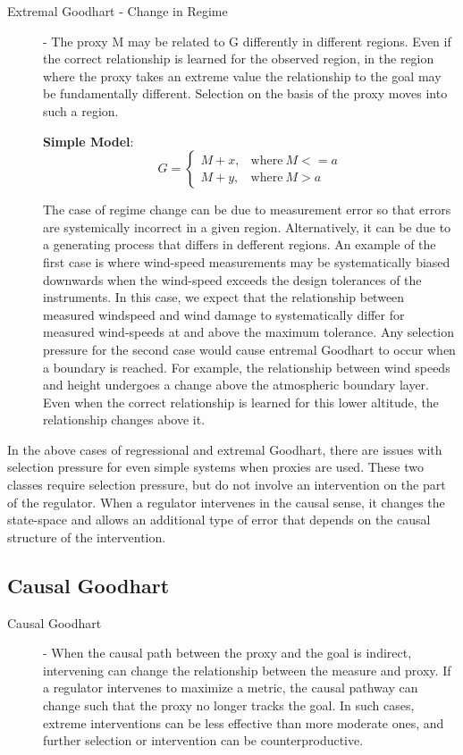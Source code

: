 \documentclass[10pt]{article}
\begin{document}
\begin{description}
\item[Extremal Goodhart - Change in Regime] - The proxy M may be related to G differently in different regions. Even if the correct relationship is learned for the observed region, in the region where the proxy takes an extreme value the relationship to the goal may be fundamentally different. Selection on the basis of the proxy moves into such a region.

\textbf{Simple Model}:  \begin{equation}
    G =
    \begin{cases}
      M + x, & \text{where}\ M <= a \\
      M + y, & \text{where}\ M > a 
    \end{cases}
  \end{equation}

The case of regime change can be due to measurement error so that errors are systemically incorrect in a given region. Alternatively, it can be due to a generating process that differs in defferent regions. An example of the first case is where wind-speed measurements may be systematically biased downwards when the wind-speed exceeds the design tolerances of the instruments. In this case, we expect that the relationship between measured windspeed and wind damage to systematically differ for measured wind-speeds at and above the maximum tolerance. Any selection pressure for the second case would cause entremal Goodhart to occur when a boundary is reached. For example, the relationship between wind speeds and height undergoes a change above the atmospheric boundary layer. Even when the correct relationship is learned for this lower altitude, the relationship changes above it.
\end{description} 

In the above cases of regressional and extremal Goodhart, there are issues with selection pressure for even simple systems when proxies are used. These two classes require selection pressure, but do not involve an intervention on the part of the regulator. When a regulator intervenes in the causal sense, it changes the state-space and allows an additional type of error that depends on the causal structure of the intervention. %

\subsection{Causal Goodhart}
\begin{description}

\item[Causal Goodhart] - When the causal path between the proxy and the goal is indirect, intervening can change the relationship between the measure and proxy. If a regulator intervenes to maximize a metric, the causal pathway can change such that the proxy no longer tracks the goal. In such cases, extreme interventions can be less effective than more moderate ones, and further selection or intervention can be counterproductive.
\end{description} 
\end{document}

